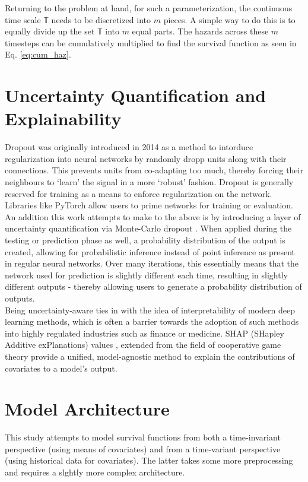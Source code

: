 \documentclass[%
 twocolumn,
 reprint,
 amsmath,amssymb,
 aps,nofootinbib
]{revtex4-2}
\begin{document}
Returning to the problem at hand, for such a parameterization, the continuous time scale $\mathbb{T}$ needs to be discretized into $m$ pieces. A simple way to do this is to equally divide up the set $\mathbb{T}$ into $m$ equal parts. The hazards across these $m$ timesteps can be cumulatively multiplied to find the survival function as seen in Eq. \ref{eq:cum_haz}. 

\section{\label{UQ_explain}Uncertainty Quantification and Explainability}
Dropout was originally introduced in 2014 \cite{dropout} as a method to intorduce regularization into neural networks by randomly dropp units along with their connections. This prevents units from co-adapting too much, thereby forcing their neighbours to `learn' the signal in a more `robust' fashion. Dropout is generally reserved for training as a means to enforce regularization on the network. Libraries like PyTorch allow users to prime networks for training or evaluation.\\

An addition this work attempts to make to the above is by introducing a layer of uncertainty quantification via Monte-Carlo dropout \cite{mcdropout}. When applied during the testing or prediction phase as well, a probability distribution of the output is created, allowing for probabilistic inference instead of point inference as present in regular neural networks. Over many iterations, this essentially means that the network used for prediction is slightly different each time, resulting in slightly different outputs - thereby allowing users to generate a probability distribution of outputs.\\

Being uncertainty-aware ties in with the idea of interpretability of modern deep learning methods, which is often a barrier towards the adoption of such methods into highly regulated industries such as finance or medicine. SHAP (SHapley Additive exPlanations) values \cite{shap}, extended from the field of cooperative game theory provide a unified, model-agnostic method to explain the contributions of covariates to a model's output.

\section{\label{model_arch}Model Architecture}
This study attempts to model survival functions from both a time-invariant perspective (using means of covariates) and from a time-variant perspective (using historical data for covariates). The latter takes some more preprocessing and requires a slghtly more complex architecture.
\end{document}
